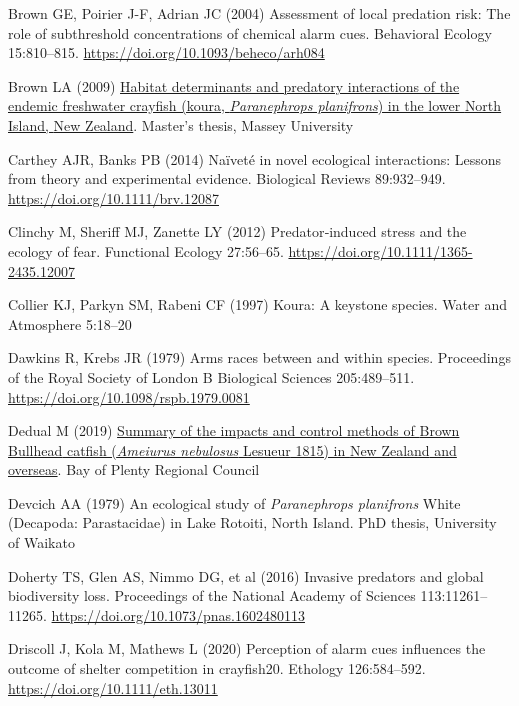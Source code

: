 \documentclass[
  letterpaper,
  DIV=11,
  numbers=noendperiod]{scrartcl}
\newlength{\cslhangindent}
\newenvironment{CSLReferences}[2] %
 {\begin{list}{}{%
  \setlength{\itemindent}{0pt}
  \setlength{\leftmargin}{0pt}
  \setlength{\parsep}{0pt}
  \ifodd #1
   \setlength{\leftmargin}{\cslhangindent}
   \setlength{\itemindent}{-1\cslhangindent}
  \fi
  \setlength{\itemsep}{#2\baselineskip}}}
 {\end{list}}
\begin{document}
\begin{CSLReferences}{1}{1}
Brown GE, Poirier J-F, Adrian JC (2004) Assessment of local predation
risk: The role of subthreshold concentrations of chemical alarm cues.
Behavioral Ecology 15:810--815.
\url{https://doi.org/10.1093/beheco/arh084}

Brown LA (2009) \href{http://hdl.handle.net/10179/1168}{Habitat
determinants and predatory interactions of the endemic freshwater
crayfish (koura, {\emph{Paranephrops planifrons}}) in the lower {North
Island}, {New Zealand}}. Master's thesis, Massey University

Carthey AJR, Banks PB (2014) Naïveté in novel ecological interactions:
Lessons from theory and experimental evidence. Biological Reviews
89:932--949. \url{https://doi.org/10.1111/brv.12087}

Clinchy M, Sheriff MJ, Zanette LY (2012) Predator‐induced stress and the
ecology of fear. Functional Ecology 27:56--65.
\url{https://doi.org/10.1111/1365-2435.12007}

Collier KJ, Parkyn SM, Rabeni CF (1997) Koura: A keystone species. Water
and Atmosphere 5:18--20

Dawkins R, Krebs JR (1979) Arms races between and within species.
Proceedings of the Royal Society of London B Biological Sciences
205:489--511. \url{https://doi.org/10.1098/rspb.1979.0081}

Dedual M (2019)
\href{https://atlas.boprc.govt.nz/api/v1/edms/document/A3591759/content}{Summary
of the impacts and control methods of {Brown Bullhead} catfish
({\emph{Ameiurus nebulosus}} {Lesueur} 1815) in {New Zealand} and
overseas}. {Bay of Plenty} Regional Council

Devcich AA (1979) An ecological study of {\emph{Paranephrops
planifrons}} {White} ({Decapoda}: {Parastacidae}) in {Lake Rotoiti},
{North Island}. PhD thesis, University of Waikato

Doherty TS, Glen AS, Nimmo DG, et al (2016) Invasive predators and
global biodiversity loss. Proceedings of the National Academy of
Sciences 113:11261--11265. \url{https://doi.org/10.1073/pnas.1602480113}

Driscoll J, Kola M, Mathews L (2020) Perception of alarm cues influences
the outcome of shelter competition in crayfish20. Ethology 126:584--592.
\url{https://doi.org/10.1111/eth.13011}


\end{CSLReferences}
\end{document}

